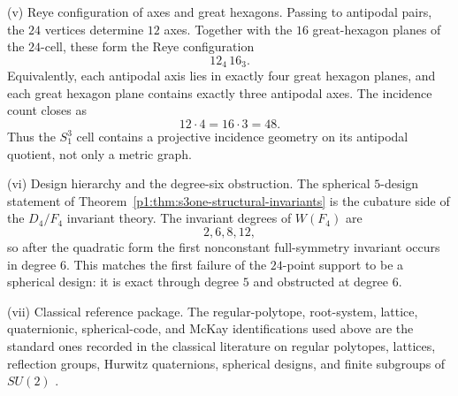 \documentclass[11pt]{article}
\begin{document}
\begin{theorem}
\smallskip
\noindent\textup{(v) Reye configuration of axes and great hexagons.}
Passing to antipodal pairs, the $24$ vertices determine $12$ axes.  Together
with the $16$ great-hexagon planes of the $24$-cell, these form the Reye
configuration
\[
    12_4\,16_3.
\]
Equivalently, each antipodal axis lies in exactly four great hexagon planes,
and each great hexagon plane contains exactly three antipodal axes.  The
incidence count closes as
\[
    12\cdot4=16\cdot3=48.
\]
Thus the \(S^3_1\) cell contains a projective incidence geometry on its
antipodal quotient, not only a metric graph.

\smallskip
\noindent\textup{(vi) Design hierarchy and the degree-six obstruction.}
The spherical $5$-design statement of
Theorem~\ref{p1:thm:s3one-structural-invariants} is the cubature side
of the $D_4/F_4$ invariant theory.  The invariant degrees of $W(F_4)$ are
\[
    2,6,8,12,
\]
so after the quadratic form the first nonconstant full-symmetry invariant occurs
in degree $6$.  This matches the first failure of the $24$-point support to be a
spherical design: it is exact through degree $5$ and obstructed at degree $6$.

\smallskip
\noindent\textup{(vii) Classical reference package.}
The regular-polytope, root-system, lattice, quaternionic, spherical-code, and
McKay identifications used above are the standard ones recorded in the classical
literature on regular polytopes, lattices, reflection groups, Hurwitz
quaternions, spherical designs, and finite subgroups of $SU(2)$
\cite{coxeter1973regular,conwaySloane1999sphere,Humphreys1990,conwaysmith2003quaternions,DelsarteGoethalsSeidel1977,CohnConwayElkiesKumar2007,deLaatLeijenhorstDeMuinckKeizer2024,McKay1980}.
\end{theorem}
\end{document}
